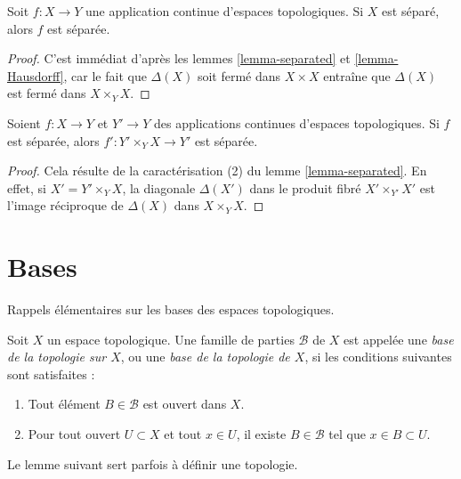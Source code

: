 \begin{lemma}
\label{lemma-from-hausdorff}
Soit $f : X \to Y$ une application continue d'espaces topologiques.
Si $X$ est séparé, alors $f$ est séparée.
\end{lemma}

\begin{proof}
C'est immédiat d'après les lemmes \ref{lemma-separated} et
\ref{lemma-Hausdorff}, car le fait que $\Delta(X)$ soit fermé dans
$X \times X$ entraîne que $\Delta(X)$ est fermé dans $X \times_Y X$.
\end{proof}

\begin{lemma}
\label{lemma-base-change-separated}
Soient $f : X \to Y$ et $Y' \to Y$ des applications continues d'espaces
topologiques. Si $f$ est séparée, alors
$f' : Y' \times_Y X \to Y'$ est séparée.
\end{lemma}

\begin{proof}
Cela résulte de la caractérisation (2) du lemme \ref{lemma-separated}.
En effet, si $X' = Y' \times_Y X$, la diagonale $\Delta(X')$ dans le produit
fibré $X' \times_{Y'} X'$ est l'image réciproque de $\Delta(X)$ dans
$X \times_Y X$.
\end{proof}




\section{Bases}
\label{section-bases}

\noindent
Rappels élémentaires sur les bases des espaces topologiques.

\begin{definition}
\label{definition-base}
Soit $X$ un espace topologique. Une famille de parties $\mathcal{B}$ de $X$
est appelée une {\it base de la topologie sur $X$}, ou une {\it base de la
topologie de $X$}, si les conditions suivantes sont satisfaites :
\begin{enumerate}
\item Tout élément $B \in \mathcal{B}$ est ouvert dans $X$.
\item Pour tout ouvert $U \subset X$ et tout $x \in U$, il existe
$B \in \mathcal{B}$ tel que $x \in B \subset U$.
\end{enumerate}
\end{definition}

\noindent
Le lemme suivant sert parfois à définir une topologie.

